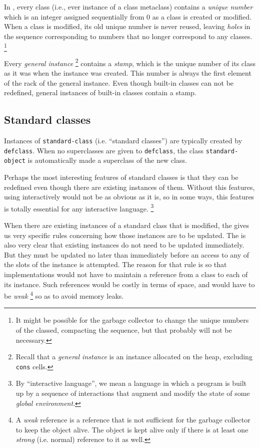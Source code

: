 In \sysname{}, every class (i.e., ever instance of a class metaclass)
contains a \emph{unique number} which is an integer assigned
sequentially from $0$ as a class is created or modified.  When a class
is modified, its old unique number is never reused, leaving
\emph{holes} in the sequence corresponding to numbers that no longer
correspond to any classes.%
\footnote{It might be possible for the garbage collector to change the
  unique numbers of the classed, compacting the sequence, but that
  probably will not be necessary.}

Every \emph{general instance}%
\footnote{Recall that a \emph{general instance} is an instance
  allocated on the heap, excluding \texttt{cons}
  cells. } contains a \emph{stamp},
which is the unique number of its class as it was when the instance
was created.  This number is always the first element of the rack of
the general instance.  Even though built-in classes can not be
redefined, general instances of built-in classes contain a stamp.

\subsection{Standard classes}
\label{object-system-standard-classes}

Instances of \texttt{standard-class} (i.e. ``standard classes'') are
typically created by \texttt{defclass}.  When no superclasses are
given to \texttt{defclass}, the class \texttt{standard-object} is
automatically made a superclass of the new class.  

Perhaps the most interesting features of standard classes is that they
can be redefined even though there are existing instances of them.
Without this features, using \commonlisp{} interactively would not be as
obvious as it is, so in some ways, this features is totally essential
for any interactive language.%
\footnote{By ``interactive language'', we mean a language in which a
  program is built up by a sequence of interactions that augment and
  modify the state of some \emph{global environment}.}

When there are existing instances of a standard class that is
modified, the \hs{} gives us very specific rules concerning how
those instances are to be updated.  The \hs{} is also very clear
that existing instances do not need to be updated immediately.  But
they must be updated no later than immediately before an access to any
of the slots of the instance is attempted.   The reason for that rule
is so that implementations would not have to maintain a reference from
a class to each of its instance.  Such references would be costly in
terms of space, and would have to be \emph{weak}%
\footnote{A \emph{weak} reference is a reference that is not
  sufficient for the garbage collector to keep the object alive.  The
  object is kept alive only if there is at least one \emph{strong}
  (i.e. normal) reference to it as well.}  so as to avoid memory
leaks.

